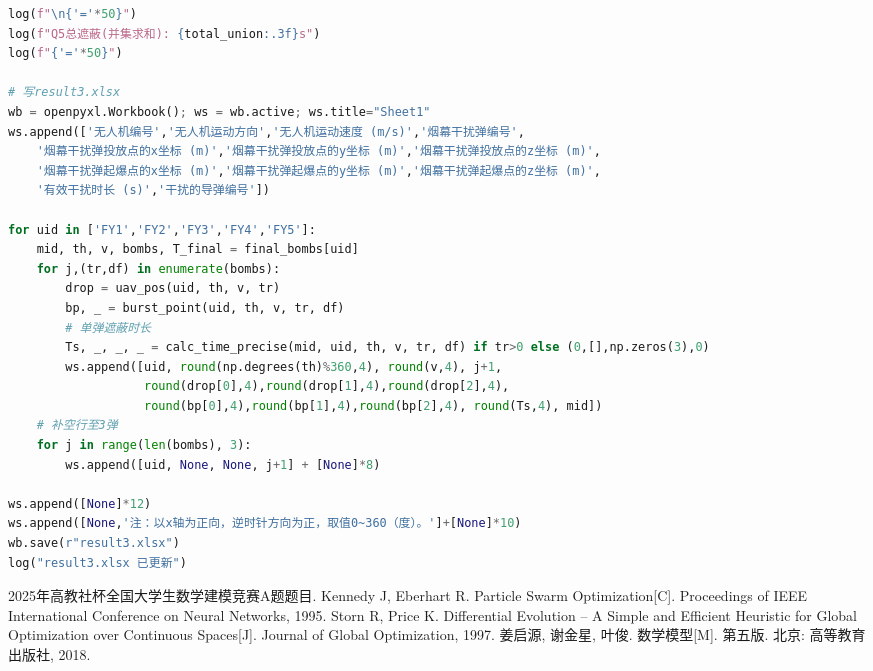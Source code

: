 \documentclass[12pt,a4paper]{article}
\begin{document}
\begin{lstlisting}[language=Python, caption={F. q5\_multi.py}]
log(f"\n{'='*50}")
log(f"Q5总遮蔽(并集求和): {total_union:.3f}s")
log(f"{'='*50}")

# 写result3.xlsx
wb = openpyxl.Workbook(); ws = wb.active; ws.title="Sheet1"
ws.append(['无人机编号','无人机运动方向','无人机运动速度 (m/s)','烟幕干扰弹编号',
    '烟幕干扰弹投放点的x坐标 (m)','烟幕干扰弹投放点的y坐标 (m)','烟幕干扰弹投放点的z坐标 (m)',
    '烟幕干扰弹起爆点的x坐标 (m)','烟幕干扰弹起爆点的y坐标 (m)','烟幕干扰弹起爆点的z坐标 (m)',
    '有效干扰时长 (s)','干扰的导弹编号'])

for uid in ['FY1','FY2','FY3','FY4','FY5']:
    mid, th, v, bombs, T_final = final_bombs[uid]
    for j,(tr,df) in enumerate(bombs):
        drop = uav_pos(uid, th, v, tr)
        bp, _ = burst_point(uid, th, v, tr, df)
        # 单弹遮蔽时长
        Ts, _, _, _ = calc_time_precise(mid, uid, th, v, tr, df) if tr>0 else (0,[],np.zeros(3),0)
        ws.append([uid, round(np.degrees(th)%360,4), round(v,4), j+1,
                   round(drop[0],4),round(drop[1],4),round(drop[2],4),
                   round(bp[0],4),round(bp[1],4),round(bp[2],4), round(Ts,4), mid])
    # 补空行至3弹
    for j in range(len(bombs), 3):
        ws.append([uid, None, None, j+1] + [None]*8)

ws.append([None]*12)
ws.append([None,'注：以x轴为正向，逆时针方向为正，取值0~360（度）。']+[None]*10)
wb.save(r"result3.xlsx")
log("result3.xlsx 已更新")
\end{lstlisting}

\begin{thebibliography}{99}
 2025年高教社杯全国大学生数学建模竞赛A题题目.
 Kennedy J, Eberhart R. Particle Swarm Optimization[C]. Proceedings of IEEE International Conference on Neural Networks, 1995.
 Storn R, Price K. Differential Evolution -- A Simple and Efficient Heuristic for Global Optimization over Continuous Spaces[J]. Journal of Global Optimization, 1997.
 姜启源, 谢金星, 叶俊. 数学模型[M]. 第五版. 北京: 高等教育出版社, 2018.
\end{thebibliography}
\end{document}

